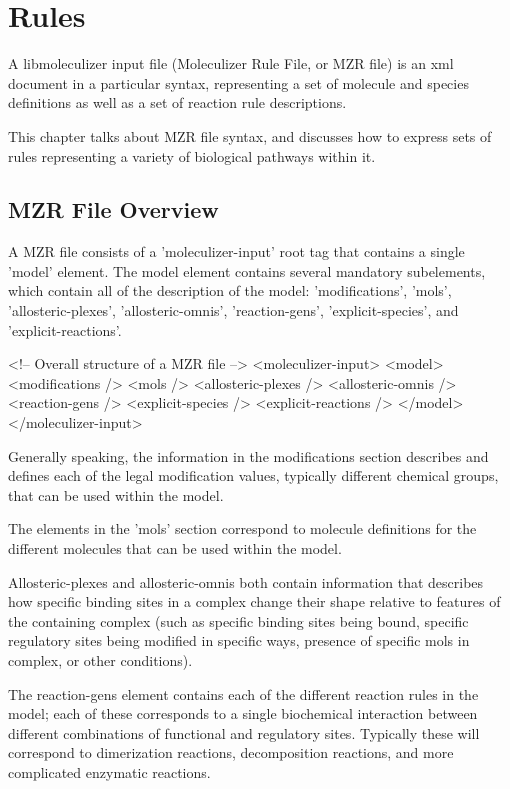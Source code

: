 \chapter{Rules}
A libmoleculizer input file (Moleculizer Rule File, or MZR
file) is an xml document in a particular syntax, representing a set
of molecule and species definitions as well as a set of reaction rule
descriptions.  

This chapter talks about MZR file syntax, and discusses how to express
sets of rules representing a variety of biological pathways within it.

\section{MZR File Overview}
A MZR file consists of a 'moleculizer-input' root tag that contains a
single 'model' element.  The model element contains several mandatory
subelements, which contain all of the description of the model:
'modifications', 'mols', 'allosteric-plexes', 'allosteric-omnis',
'reaction-gens', 'explicit-species', and 'explicit-reactions'. 

\begin{ExampleXML}[caption=Overall structure of a MZR file, label=overallmzrstruct]
<!-- Overall structure of a MZR file -->
<moleculizer-input>
  <model>
    <modifications />
    <mols />
    <allosteric-plexes />
    <allosteric-omnis />
    <reaction-gens />
    <explicit-species />
    <explicit-reactions />
  </model>
</moleculizer-input>
\end{ExampleXML}

Generally speaking, the information in the modifications section
describes and defines each of the legal modification values, typically
different chemical groups, that can be used within the model.  

The elements in the 'mols' section correspond to molecule definitions for
the different molecules that can be used within the model.

Allosteric-plexes and allosteric-omnis both contain information that
describes how specific binding sites in a complex change their shape
relative to features of the containing complex (such as specific
binding sites being bound, specific regulatory sites being modified in
specific ways, presence of specific mols in complex, or other
conditions).  

The reaction-gens element contains each of the different reaction
rules in the model; each of these corresponds to a single biochemical
interaction between different combinations of functional and
regulatory sites.  Typically these will correspond to dimerization
reactions, decomposition reactions, and more complicated enzymatic
reactions. 
 
